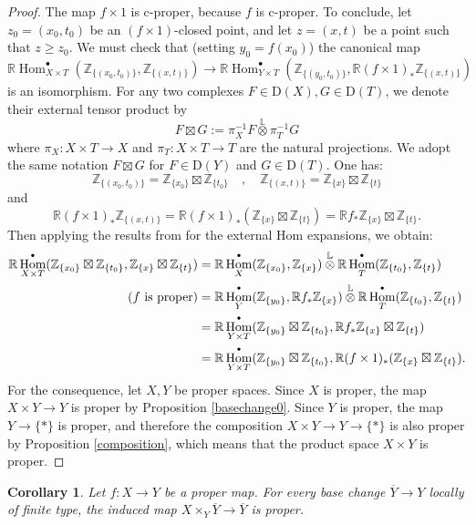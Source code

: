 \documentclass[amssymb,amscd,11pt,20pt]{amsart}
\newcommand{\LL}{{\mathbb L}}
\newcommand{\ZZ}{{\mathbb Z}}
\newcommand{\RR}{\mathbb R}
\newcommand{\0}{\mathbf 0}
\DeclareMathOperator{\Hom}{{Hom}}
\newcommand{\pun}{{\scriptscriptstyle \bullet}}
\theoremstyle{plain}
\newtheorem{cor}[thm]{Corollary}
\numberwithin{equation}{thm}
\begin{document}
\begin{proof} The map $f\times 1$ is c-proper, because $f$ is c-proper. To conclude, let $z_0=(x_0,t_0)$ be an $(f\times 1)$-closed point, and let $z=(x,t)$ be a point such that $z \geq z_0$. We must check that (setting $y_0=f(x_0)$) the canonical map
$$\RR\Hom_{X\times T}^\pun(\ZZ_{\{(x_0,t_0)\}}, \ZZ_{\{(x,t)\}})\to \RR\Hom_{Y\times T}^\pun(\ZZ_{\{(y_0,t_0)\}},\RR (f\times 1)_* \ZZ_{\{(x,t)\}})$$ is an isomorphism. For any two complexes $F\in \mathrm{D}(X),G\in \mathrm{D}(T)$, we denote their external tensor product by
\[ F\boxtimes G:=\pi_X^{-1}F\overset\LL\otimes\pi_T^{-1}G\] where $\pi_X\colon X\times T\to X$ and $\pi_T\colon X\times T\to T$ are the natural projections. We adopt the same notation  $F\boxtimes G$ for $F\in \mathrm{D}(Y)$ and $G\in \mathrm{D}(T)$. One has:
\[ \ZZ_{\{(x_0,t_0)\}} = \ZZ_{\{x_0\}}\boxtimes \ZZ_{\{t_0\}} \quad,\quad \ZZ_{\{(x,t)\}} = \ZZ_{\{x\}}\boxtimes \ZZ_{\{t\}}\] and
\[ \RR (f\times 1)_* \ZZ_{\{(x,t)\}}= \RR (f\times 1)_* (\ZZ_{\{x\}}\boxtimes \ZZ_{\{t\}}) =  \RR f_* \ZZ_{\{x\}}\boxtimes \ZZ_{\{t\}}.\]
 Then applying the results from \cite[Prop. 4.23]{ST2} for the external Hom expansions, we obtain:
\[\aligned  \RR\Hom_{X\times T}^\pun(\ZZ_{\{x_0\}}\boxtimes \ZZ_{\{t_0\}},  \ZZ_{\{x\}}\boxtimes \ZZ_{\{t\}}) &= \RR\Hom_{X}^\pun(\ZZ_{\{x_0\}},  \ZZ_{\{x\}})\overset\LL\otimes
\RR\Hom_{ T}^\pun(\ZZ_{\{t_0\}},   \ZZ_{\{t\}})
\\  (f\text{ is proper})& = \RR\Hom_{Y}^\pun(\ZZ_{\{y_0\}},  \RR f_*  \ZZ_{\{x\}})\overset\LL\otimes
\RR\Hom_{ T}^\pun(\ZZ_{\{t_0\}},   \ZZ_{\{t\}})
\\ & = \RR\Hom_{Y\times T}^\pun(\ZZ_{\{y_0\}}\boxtimes \ZZ_{\{t_0\}},\RR f_* \ZZ_{\{x\}}\boxtimes \ZZ_{\{t\}})
\\ & = \RR\Hom_{Y\times T}^\pun(\ZZ_{\{y_0\}}\boxtimes \ZZ_{\{t_0\}}, \RR (f\times 1)_* (\ZZ_{\{x\}}\boxtimes \ZZ_{\{t\}})
. \endaligned\] 
For the consequence, let $X,Y$ be proper spaces. Since $X$ is proper, the map   $X\times Y\to Y$ is proper by Proposition \ref{basechange0}. Since $Y$ is proper, the map $Y\to\{*\}$ is proper, and therefore the composition $X\times Y\to Y\to \{*\}$ is also proper by Proposition \ref{composition}, which means that the product space $X\times Y$ is proper. 
\end{proof}



\begin{cor}\label{properbasechange} Let $f\colon X\to Y$ be a proper map. For every base change $\overline Y\to Y$ locally of finite type, the induced map $X\times_Y\overline Y \to \overline Y $ is proper.
\end{cor}
\end{document}
